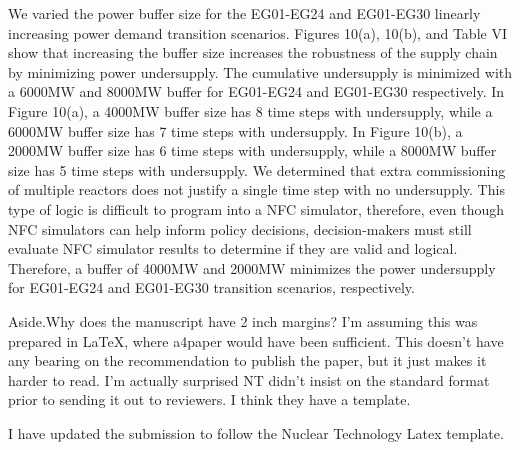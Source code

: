 \documentclass[answers,11pt]{exam}
\begin{document}
\begin{questions}
\begin{solution}
We varied the power buffer size for the EG01-EG24 and EG01-EG30 
linearly increasing power demand transition scenarios. 
Figures 10(a), 10(b), 
and Table VI 
show that increasing the buffer size increases the robustness 
of the supply chain by minimizing power undersupply. 
The cumulative undersupply is minimized with a 6000MW and 8000MW 
buffer for EG01-EG24 and EG01-EG30 respectively.
In Figure 10(a), a 4000MW buffer size has 
8 time steps with undersupply, while a 6000MW buffer size has 
7 time steps with undersupply. 
In Figure 10(b), a 2000MW buffer size has 
6 time steps with undersupply, while a 8000MW buffer size has 
5 time steps with undersupply. 
We determined that extra commissioning of multiple reactors does not 
justify a single time step with no undersupply. 
This type of logic is difficult to program into a NFC simulator, 
therefore, even though NFC simulators can help inform policy decisions, 
decision-makers must still evaluate NFC simulator results to determine if 
they are valid and logical. 
Therefore, a buffer of 4000MW and 2000MW minimizes 
the power undersupply for EG01-EG24 and EG01-EG30 transition 
scenarios, respectively.
\end{solution}

\question 
Aside.Why does the manuscript have 2 inch margins? I’m assuming this was prepared in LaTeX, where
a4paper would have been sufficient. This doesn’t have any bearing on the recommendation to publish
the paper, but it just makes it harder to read. I’m actually surprised NT didn’t insist on the standard
format prior to sending it out to reviewers. I think they have a template.

\begin{solution}
I have updated the submission to follow the Nuclear Technology Latex template. 
\end{solution}

\end{questions}
\end{document}
